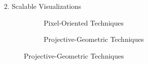 \begin{frame}{2. Scalable Visualizations}
\begin{figure}
    \begin{subfigure}
        \centering
        \caption{Pixel-Oriented Techniques}
        \label{fig:pixel-oriented}
    \end{subfigure}
    \begin{subfigure}
        \centering
        \caption{Projective-Geometric Techniques}
        \label{fig:projective-geometric}
    \end{subfigure}
    
\end{figure}
\end{frame}

